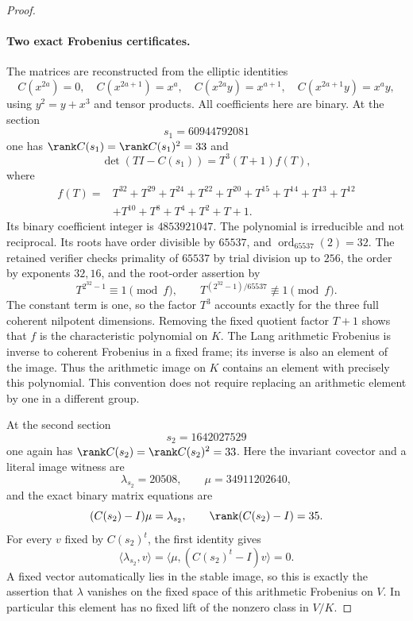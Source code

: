 \begin{proof}
\paragraph{Two exact Frobenius certificates.}
The matrices are reconstructed from the elliptic identities
\[
 C(x^{2a})=0,\quad C(x^{2a+1})=x^a,\quad
 C(x^{2a}y)=x^{a+1},\quad C(x^{2a+1}y)=x^a y,
\]
using $y^2=y+x^3$ and tensor products. All coefficients here are binary.
At the section
\[
                         s_1=60944792081
\]
one has $\rank C(s_1)=\rank C(s_1)^2=33$ and
\[
 \det(TI-C(s_1))=T^3(T+1)f(T),
\]
where
\begin{align*}
 f(T)={}&T^{32}+T^{29}+T^{24}+T^{22}+T^{20}
       +T^{15}+T^{14}+T^{13}+T^{12}\\
       &+T^{10}+T^8+T^4+T^2+T+1.
\end{align*}
Its binary coefficient integer is $4853921047$.
The polynomial is irreducible and not reciprocal. Its roots have order
divisible by $65537$, and
$\operatorname{ord}_{65537}(2)=32$.
The retained verifier checks primality of $65537$ by trial division up
to $256$, the order by exponents $32,16$, and the root-order assertion by
\[
 T^{2^{32}-1}\equiv1\pmod f,\qquad
 T^{(2^{32}-1)/65537}\not\equiv1\pmod f.
\]
The constant term is one, so the factor $T^3$ accounts exactly for the
three full coherent nilpotent dimensions. Removing the fixed quotient
factor $T+1$ shows that $f$ is the characteristic polynomial on $K$.
The Lang arithmetic Frobenius is inverse to coherent Frobenius in a
fixed frame; its inverse is also an element of the image. Thus the
arithmetic image on $K$ contains an element with precisely this
polynomial. This convention does not require replacing an arithmetic
element by one in a different group.

At the second section
\[
                         s_2=1642027529
\]
one again has $\rank C(s_2)=\rank C(s_2)^2=33$.
Here the invariant covector and a literal image witness are
\[
              \lambda_{s_2}=20508,\qquad \mu=34911202640,
\]
and the exact binary matrix equations are
\begin{equation}\label{eq:ss-degree-two-fixed-lift-obstruction}
 (C(s_2)-I)\mu=\lambda_{s_2},\qquad
 \rank(C(s_2)-I)=35.
\end{equation}
For every $v$ fixed by $C(s_2)^t$, the first identity gives
\[
 \langle\lambda_{s_2},v\rangle
 =\langle\mu,(C(s_2)^t-I)v\rangle=0.
\]
A fixed vector automatically lies in the stable image, so this is
exactly the assertion that $\lambda$ vanishes on the fixed space of
this arithmetic Frobenius on $V$. In particular this element has no
fixed lift of the nonzero class in $V/K$.


\end{proof}
